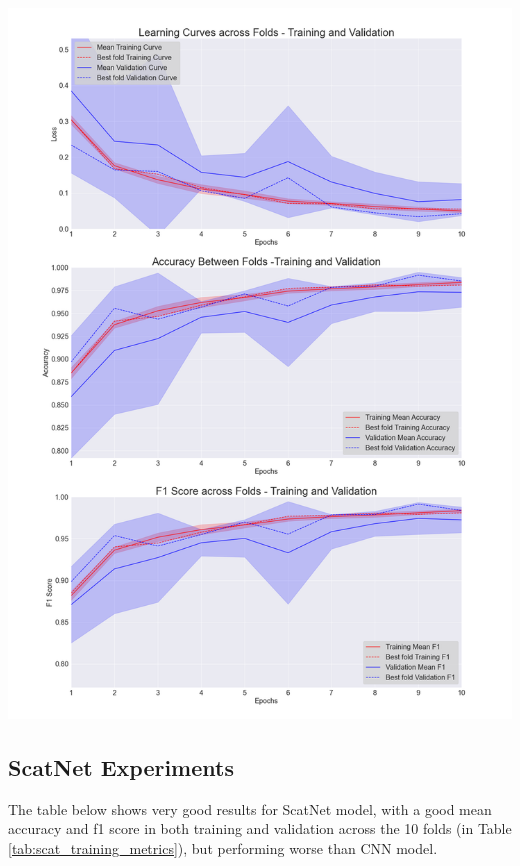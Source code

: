 \documentclass[11pt]{article}
\newenvironment{Figure}
  {\par\medskip\noindent\minipage{\linewidth}}
  {\endminipage\par\medskip}
\begin{document}
\begin{multicols*}{2}
\begin{Figure}
    \centering
    \includegraphics[width=\linewidth]{images/cnn_curves.png}
    \label{fig:cnn-curves}
\end{Figure}


\subsection{ScatNet Experiments}
The table below shows very good results for ScatNet model, with a good mean accuracy and f1 score in both training and validation across the 10 folds (in Table \ref{tab:scat_training_metrics}), but performing worse than CNN model.


\end{multicols*}
\end{document}
